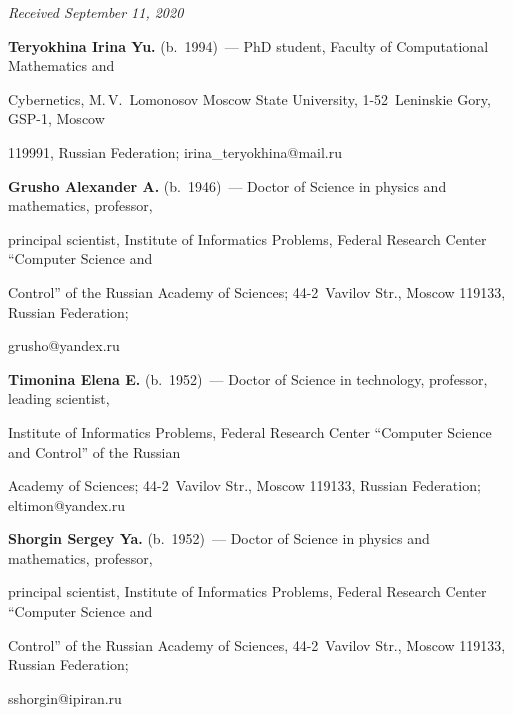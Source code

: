 





\hfill{\small\textit{Received September 11, 2020}} 








\Contr



\noindent

\textbf{Teryokhina Irina Yu.} (b.\ 1994)~--- PhD student, Faculty of Computational Mathematics and 

Cybernetics, M.\,V.~Lomonosov Moscow State University, 1-52~Leninskie Gory, GSP-1, Moscow 

119991, Russian Federation; \mbox{irina\_teryokhina@mail.ru}



\vspace*{3pt}



\noindent

\textbf{Grusho Alexander A.} (b.\ 1946)~--- Doctor of Science in physics and mathematics, professor, 

principal scientist, Institute of Informatics Problems, Federal Research Center ``Computer Science and 

Control'' of the Russian Academy of Sciences; 44-2~Vavilov Str., Moscow 119133, Russian Federation; 

\mbox{grusho@yandex.ru}



\vspace*{3pt}



\noindent

\textbf{Timonina Elena E.} (b.\ 1952)~--- Doctor of Science in technology, professor, leading scientist, 

Institute of Informatics Problems, Federal Research Center ``Computer Science and Control'' of the Russian 

Academy of Sciences; 44-2~Vavilov Str., Moscow 119133, Russian Federation; \mbox{eltimon@yandex.ru}



\vspace*{3pt}



\noindent

\textbf{Shorgin Sergey Ya.} (b.\ 1952)~--- Doctor of Science in physics and mathematics, professor, 

principal scientist, Institute of Informatics Problems, Federal Research Center ``Computer Science and 

Control'' of the Russian Academy of Sciences, 44-2~Vavilov Str., Moscow 119133, Russian Federation; 

\mbox{sshorgin@ipiran.ru}



\label{end\stat}



\renewcommand{\bibname}{\protect\rm Литература} 

